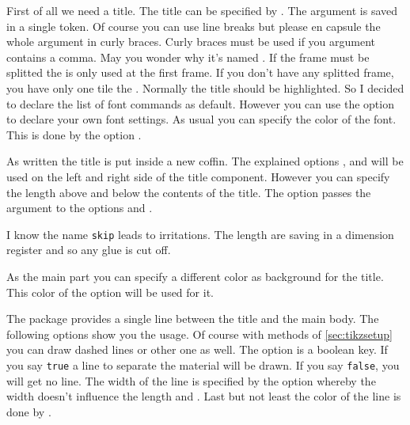 \documentclass[openany,12pt,tocdepth=3]{ltx-md}
\begin{document}
First of all we need a title. The title can be specified by . The argument
is saved in a single token. Of course you can use line breaks but please en capsule
the whole argument in curly braces. Curly braces must be used if you argument contains
a comma. May you wonder why it's named . If the frame
must be splitted the  is only used at the first frame. If
you don't have any splitted frame, you have only one tile the .
Normally the title should be highlighted. So I decided to declare the list of
font commands as default. However you can use the option  to
declare your own font settings.
As usual you can specify the color of the font. This is done by the option
.

As written the title is put inside a new coffin. The explained options ,
 and  will be used on the left and right side of
the title component. However you can specify the length above and below the contents of the title. 
The option  passes the argument to the options 
and .


\begin{Note}
I know the name \texttt{skip} leads to irritations. The length are saving in a
dimension register and so any glue  is cut off.
\end{Note}

As the main part you can specify a different color as background for
the title. This color of the option  will be used for it.


The package  provides a single line between the title and the main body.
The following options show you the usage. Of course with methods of
\autoref{sec:tikzsetup} you can draw dashed lines or other one as well.
The option  is a boolean key. If you say \texttt{true} a line to separate
the material will be drawn. If you say \texttt{false}, you will get no line.
The width of the line is specified by the option  whereby
the width doesn't influence the length  and .
Last but not least the color of the line is done by .
\end{document}

